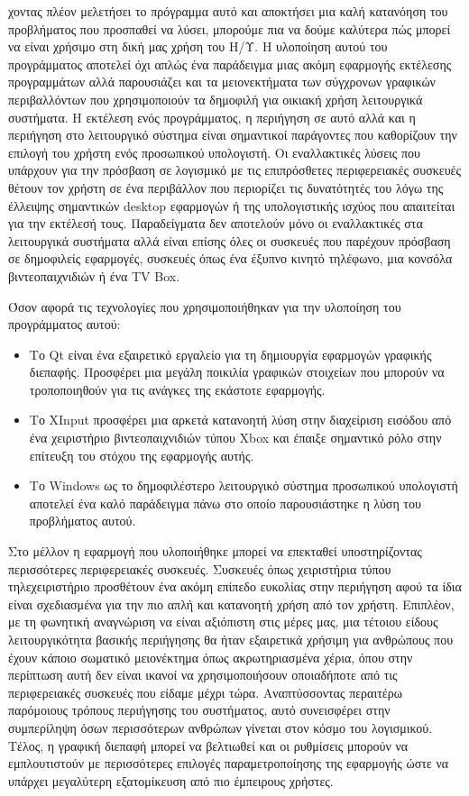 χοντας πλέον μελετήσει το πρόγραμμα αυτό και αποκτήσει μια καλή κατανόηση του
προβλήματος που προσπαθεί να λύσει, μπορούμε πια να δούμε καλύτερα πώς μπορεί
να είναι χρήσιμο στη δική μας χρήση του Η/Υ. Η υλοποίηση αυτού του προγράμματος
αποτελεί όχι απλώς ένα παράδειγμα μιας ακόμη εφαρμογής εκτέλεσης προγραμμάτων αλλά
παρουσιάζει και τα μειονεκτήματα των σύγχρονων γραφικών περιβαλλόντων που χρησιμοποιούν
τα δημοφιλή για οικιακή χρήση λειτουργικά συστήματα. Η εκτέλεση ενός προγράμματος, η περιήγηση
σε αυτό αλλά και η περιήγηση στο λειτουργικό σύστημα είναι σημαντικοί παράγοντες
που καθορίζουν την επιλογή του χρήστη ενός προσωπικού υπολογιστή. Οι εναλλακτικές λύσεις που
υπάρχουν για την πρόσβαση σε λογισμικό με τις επιπρόσθετες περιφερειακές συσκευές
θέτουν τον χρήστη σε ένα περιβάλλον που περιορίζει τις δυνατότητές του λόγω της έλλειψης
σημαντικών desktop εφαρμογών ή της υπολογιστικής ισχύος που απαιτείται για την εκτέλεσή τους.
Παραδείγματα δεν αποτελούν μόνο οι εναλλακτικές στα λειτουργικά συστήματα αλλά είναι επίσης
όλες οι συσκευές που παρέχουν πρόσβαση σε δημοφιλείς εφαρμογές, συσκευές όπως ένα έξυπνο κινητό
τηλέφωνο, μια κονσόλα βιντεοπαιχνιδιών ή ένα TV Box.

Όσον αφορά τις τεχνολογίες που χρησιμοποιήθηκαν για την υλοποίηση του προγράμματος αυτού:
\begin{itemize}
	\item
Το Qt είναι ένα εξαιρετικό εργαλείο για τη δημιουργία εφαρμογών γραφικής διεπαφής. Προσφέρει
μια μεγάλη ποικιλία γραφικών στοιχείων που μπορούν να τροποποιηθούν για τις ανάγκες της εκάστοτε
εφαρμογής.
	\item
Το XInput προσφέρει μια αρκετά κατανοητή λύση στην διαχείριση εισόδου από ένα χειριστήριο βιντεοπαιχνιδιών
τύπου Xbox και έπαιξε σημαντικό ρόλο στην επίτευξη του στόχου της εφαρμογής αυτής.
	\item
Το Windows ως το δημοφιλέστερο λειτουργικό σύστημα προσωπικού υπολογιστή αποτελεί ένα καλό παράδειγμα πάνω
στο οποίο παρουσιάστηκε η λύση του προβλήματος αυτού.
\end{itemize} 

 
Στο μέλλον η εφαρμογή που υλοποιήθηκε μπορεί να επεκταθεί υποστηρίζοντας περισσότερες περιφερειακές
συσκευές. Συσκευές όπως χειριστήρια τύπου τηλεχειριστήριο προσθέτουν ένα ακόμη επίπεδο ευκολίας στην
περιήγηση αφού τα ίδια είναι σχεδιασμένα για την πιο απλή και κατανοητή χρήση από τον χρήστη. Επιπλέον,
με τη φωνητική αναγνώριση να είναι αξιόπιστη στις μέρες μας, μια τέτοιου είδους λειτουργικότητα βασικής
περιήγησης θα ήταν εξαιρετικά χρήσιμη για ανθρώπους που έχουν κάποιο σωματικό μειονέκτημα όπως ακρωτηριασμένα
χέρια, όπου στην περίπτωση αυτή δεν είναι ικανοί να χρησιμοποιήσουν οποιαδήποτε από τις περιφερειακές συσκευές
που είδαμε μέχρι τώρα. Αναπτύσσοντας περαιτέρω παρόμοιους τρόπους περιήγησης του συστήματος, αυτό συνεισφέρει στην
συμπερίληψη όσων περισσότερων ανθρώπων γίνεται στον κόσμο του λογισμικού. Τέλος, η γραφική διεπαφή μπορεί
να βελτιωθεί και οι ρυθμίσεις μπορούν να εμπλουτιστούν με περισσότερες επιλογές παραμετροποίησης της εφαρμογής
ώστε να υπάρχει μεγαλύτερη εξατομίκευση από πιο έμπειρους χρήστες.